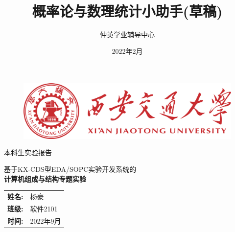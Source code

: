 \documentclass[12pt, a4paper, oneside]{ctexbook}
\title{\textbf{概率论与数理统计小助手(草稿)}}
\author{仲英学业辅导中心}
\date{2022年2月}
\begin{document}
\thispagestyle{empty}

\begin{figure}[t]
    \centering
    \includegraphics[width=13cm]{../pic/xjtu.png}
\end{figure}
\begin{center}
    \huge{本科生实验报告}
\end{center}
\vspace*{\fill}
    \begin{center}
        \Large{基于KX-CDS型EDA/SOPC实验开发系统的}\\
        \Huge\textbf{计算机组成与结构专题实验}
    \end{center}
\vspace*{\fill}

\begin{table}[b]
    \centering
    \large
    \begin{tabular}{ll}
        \textbf{姓名:} & 杨豪 \\
        \textbf{班级:} & 软件2101 \\
        \textbf{时间:} & 2022年9月 \\
    \end{tabular}
\end{table}


\newpage
{}
\setcounter{page}{1}
\tableofcontents

\newpage
\setcounter{page}{1}

\setcounter{chapter}{0}


% 
% 
% 
\end{document}
